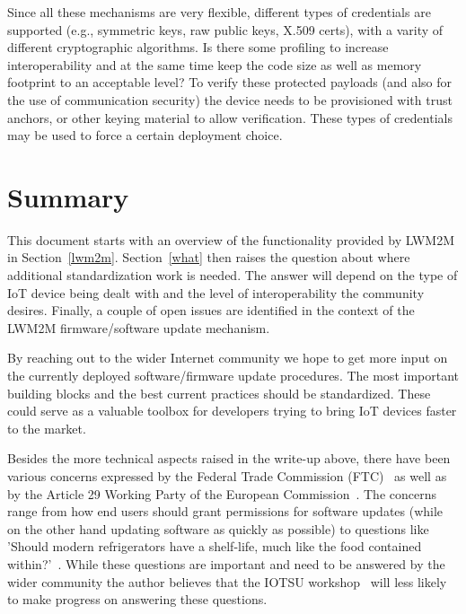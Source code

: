 \documentclass[peerreview, a4paper, 7pt]{IEEEtran}
\begin{document}
Since all these mechanisms are very flexible, different types of credentials are supported (e.g., symmetric keys, raw public keys, X.509 certs), with a varity of different cryptographic algorithms. Is there some profiling to increase interoperability and at the same time keep the code size as well as memory footprint to an acceptable level? To verify these protected payloads (and also for the use of communication security) the device needs to be provisioned with trust anchors, or other keying material to allow verification. These types of credentials may be used to force a certain deployment choice.

\section{Summary}
This document starts with an overview of the functionality provided by LWM2M in Section~\ref{lwm2m}. Section~\ref{what} then raises the question about where additional standardization work is needed. The answer will depend on the type of IoT device being dealt with and the level of interoperability the community desires. Finally, a couple of open issues are identified in the context of the LWM2M firmware/software update mechanism. 

By reaching out to the wider Internet community we hope to get more input on the currently deployed software/firmware update procedures. The most important building blocks and the best current practices should be standardized. These could serve as a valuable toolbox for developers trying to bring IoT devices faster to the market.

Besides the more technical aspects raised in the write-up above, there have been various concerns expressed by the Federal Trade Commission (FTC)~\cite{FTC} as well as by the Article 29 Working Party of the European Commission~\cite{Article29WP}. The concerns range from how end users should grant permissions for software updates (while on the other hand updating software as quickly as possible) to questions like 'Should modern refrigerators have a shelf-life, much like the food contained within?'~\cite{ShelfLife}. While these questions are important and need to be answered by the wider community the author believes that the IOTSU workshop~\cite{IOTSU} will less likely to make progress on answering these questions.  


% 

\end{document}
